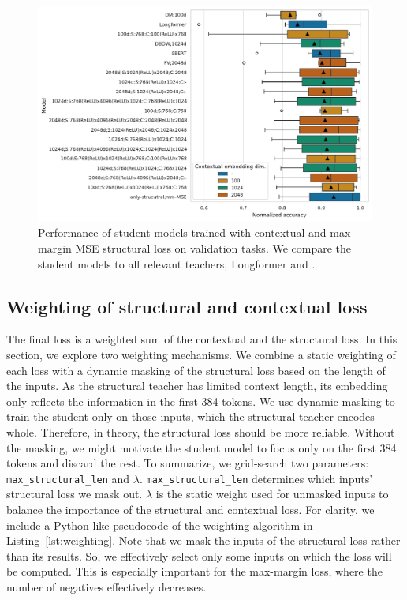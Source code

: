 \begin{figure}

  \includegraphics[width=\textwidth]{img/projections_contextual_mm_mse.pdf}

  \caption{Performance of student models trained with contextual and
  max-margin MSE structural loss on validation tasks. We compare the student
  models to all relevant teachers, Longformer and
  .}

  \label{fig:mm_mse_contextual_projections}

\end{figure}

\subsection{Weighting of structural and contextual
loss}\label{section:weighting_experiments}

The final loss is a weighted sum of the contextual and the structural loss. In
this section, we explore two weighting mechanisms. We combine a static
weighting of each loss with a dynamic masking of the structural loss based on
the length of the inputs. As the structural teacher has limited context length, its
embedding only reflects the information in the first 384 tokens. We use dynamic
masking to train the student only on those inputs, which the structural teacher
encodes whole. Therefore, in theory, the structural loss should be more
reliable. Without the masking, we might motivate the student model to focus only on the first 384 tokens and discard the rest. To summarize, we grid-search two parameters:
\texttt{max\_structural\_len} and $\lambda$. \texttt{max\_structural\_len}
determines which inputs' structural loss we mask out. $\lambda$ is the static
weight used for unmasked inputs to balance the importance of the structural and
contextual loss. For clarity, we include a Python-like pseudocode of the
weighting algorithm in Listing~\ref{lst:weighting}. Note that we mask the
inputs of the structural loss rather than its results. So, we effectively
select only some inputs on which the loss will be computed. This is especially
important for the max-margin loss, where the number of negatives effectively
decreases.

